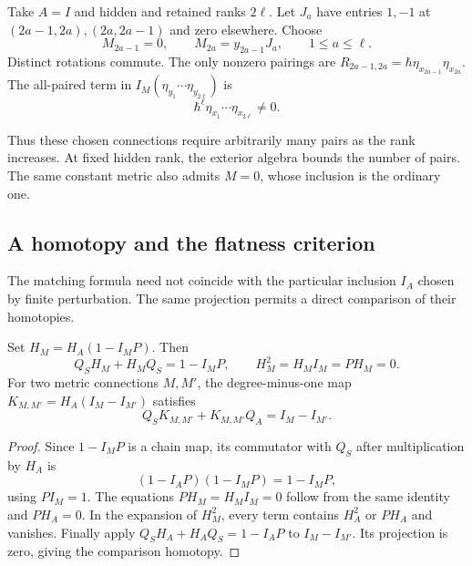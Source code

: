 \begin{example}\label{cbc:cf:rotations}
Take $A=I$ and hidden and retained ranks $2\ell$. Let $J_a$
have entries $1,-1$ at $(2a-1,2a),(2a,2a-1)$ and zero
elsewhere. Choose
\[
 M_{2a-1}=0,\qquad M_{2a}=y_{2a-1}J_a,
 \qquad 1\leq a\leq\ell.
\]
Distinct rotations commute. The only nonzero pairings are
$R_{2a-1,2a}=\hbar\eta_{x_{2a-1}}\eta_{x_{2a}}$.
The all-paired term in
$I_M(\eta_{y_1}\cdots\eta_{y_{2\ell}})$ is
\[
 \hbar^\ell\eta_{x_1}\cdots\eta_{x_{2\ell}}\ne0.
\]

Thus these chosen connections require arbitrarily many pairs
as the rank increases. At fixed hidden rank, the exterior
algebra bounds the number of pairs. The same constant metric
also admits $M=0$, whose inclusion is the ordinary one.
\end{example}

\subsection{A homotopy and the flatness criterion}

The matching formula need not coincide with the particular
inclusion $I_A$ chosen by finite perturbation. The same
projection permits a direct comparison of their homotopies.

\begin{proposition}\label{cbc:cf:matching-homotopy}
Set $H_M=H_A(1-I_MP)$. Then
\[
 Q_SH_M+H_MQ_S=1-I_MP,\qquad
 H_M^2=H_MI_M=PH_M=0.
\]
For two metric connections $M,M'$, the degree-minus-one map
$K_{M,M'}=H_A(I_M-I_{M'})$ satisfies
\[
 Q_SK_{M,M'}+K_{M,M'}Q_A=I_M-I_{M'}.
\]
\end{proposition}
\begin{proof}
Since $1-I_MP$ is a chain map, its commutator with $Q_S$
after multiplication by $H_A$ is
\[
 (1-I_AP)(1-I_MP)=1-I_MP,
\]
using $PI_M=1$. The equations $PH_M=H_MI_M=0$ follow
from the same identity and $PH_A=0$. In the expansion of
$H_M^2$, every term contains $H_A^2$ or $PH_A$ and vanishes.
Finally apply $Q_SH_A+H_AQ_S=1-I_AP$ to $I_M-I_{M'}$.
Its projection is zero, giving the comparison homotopy.
\end{proof}

